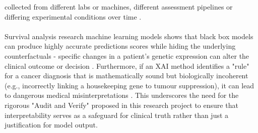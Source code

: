 collected from different labs or machines, different assessment pipelines or differing experimental 
conditions over time \cite{Yu2024}. 
\\\\
Survival analysis research machine learning models shows that black box models can produce highly 
accurate predictions scores while hiding the underlying counterfactuals - specific changes in a patient's 
genetic expression can alter the clinical outcome or decision \cite{Kovalev2021}. Furthermore, if an 
XAI method identifies a "rule" for a cancer diagnosis that is mathematically sound but biologically 
incoherent (e.g., incorrectly linking a housekeeping gene to tumour suppression), it can lead to dangerous 
medical misinterpretations \cite{Partin2023,Klauschen2024}. This underscores the need for the 
rigorous "Audit and Verify" proposed in this research project to ensure that interpretability serves as a 
safeguard for clinical truth rather than just a justification for model output. 
